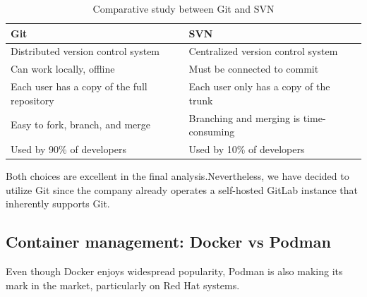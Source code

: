 \begin{table}[h!]
  \centering
  \renewcommand{\arraystretch}{1.5} 
  \caption{Comparative study between Git and SVN}
  \label{tab: comparative_study_between_Git_and_SVN}
  \begin{tabularx}{\textwidth}{|>{\centering\arraybackslash}X|>{\centering\arraybackslash}X|}
      \hline
      \rowcolor{blue!20} 
      \textbf{Git} & \textbf{SVN} \\
      \hline
       Distributed version
control system & Centralized version
control system \\
      \hline
      Can work locally, offline & Must be connected to commit \\
      \hline
      Each user has a copy of the full repository & Each user only has a copy of the trunk  \\
      \hline
      Easy to fork, branch, and merge & Branching and merging is time-consuming  \\
      \hline
      Used by 90\% of developers & Used by 10\% of developers  \\
      \hline
  \end{tabularx}
\end{table}
Both choices are excellent in the final analysis.Nevertheless, we have decided to utilize Git since the company already operates a self-hosted GitLab instance that inherently supports Git.


\subsection{Container management: Docker vs Podman}
Even though Docker enjoys widespread popularity, Podman is also making its mark in the market, particularly on Red Hat systems.


